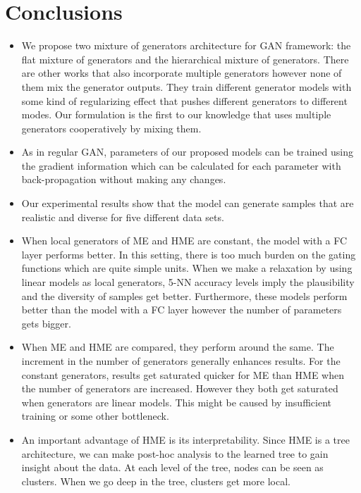 \documentclass[a4paper,onesided,12pt]{report}
\begin{document}
\section{Conclusions}
\label{sec:conc}
\begin{itemize}
\item We propose two mixture of generators architecture for GAN framework: the flat mixture of generators and the hierarchical mixture of generators. There are other works that also incorporate multiple generators however none of them mix the generator outputs. They train different generator models with some kind of regularizing effect that pushes different generators to different modes. Our formulation is the first to our knowledge that uses multiple generators cooperatively by mixing them. 
\item As in regular GAN, parameters of our proposed models can be trained using the gradient information which can be calculated for each parameter with back-propagation without making any changes.
\item Our experimental results show that the model can generate samples that are realistic and diverse for five different data sets.
\item When local generators of ME and HME are constant, the model with a FC layer performs better. In this setting, there is too much burden on the gating functions which are quite simple units. When we make a relaxation by using linear models as local generators, 5-NN accuracy levels imply the plausibility and the diversity of samples get better. Furthermore, these models perform better than the model with a FC layer however the number of parameters gets bigger.
\item When ME and HME are compared, they perform around the same. The increment in the number of generators generally enhances results. For the constant generators, results get saturated quicker for ME than HME when the number of generators are increased. However they both get saturated when generators are linear models. This might be caused by insufficient training or some other bottleneck.
\item An important advantage of HME is its interpretability. Since HME is a tree architecture, we can make post-hoc analysis to the learned tree to gain insight about the data. At each level of the tree, nodes can be seen as clusters. When we go deep in the tree, clusters get more local.
\end{itemize}
\end{document}
